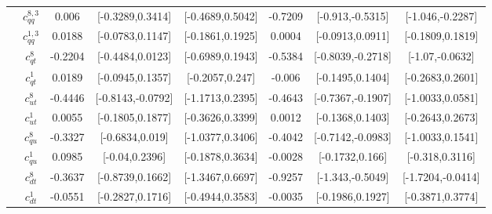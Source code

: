 \documentclass{article}
\begin{document}
\begin{table}[H]
\begin{tabular}{|c|c|c|c|c|c|c|c|}
 & $c_{qq}^{8,3}$ & 0.006                             & [-0.3289,0.3414]                                 & [-0.4689,0.5042] & -0.7209                             & [-0.913,-0.5315]                                 & [-1.046,-0.2287] \\ \cline{2-8}
 & $c_{qq}^{1,3}$ & 0.0188                             & [-0.0783,0.1147]                                 & [-0.1861,0.1925] & 0.0004                             & [-0.0913,0.0911]                                 & [-0.1809,0.1819] \\ \cline{2-8}
 & $c_{qt}^{8}$ & -0.2204                             & [-0.4484,0.0123]                                 & [-0.6989,0.1943] & -0.5384                             & [-0.8039,-0.2718]                                 & [-1.07,-0.0632] \\ \cline{2-8}
 & $c_{qt}^{1}$ & 0.0189                             & [-0.0945,0.1357]                                 & [-0.2057,0.247] & -0.006                             & [-0.1495,0.1404]                                 & [-0.2683,0.2601] \\ \cline{2-8}
 & $c_{ut}^{8}$ & -0.4446                             & [-0.8143,-0.0792]                                 & [-1.1713,0.2395] & -0.4643                             & [-0.7367,-0.1907]                                 & [-1.0033,0.0581] \\ \cline{2-8}
 & $c_{ut}^{1}$ & 0.0055                             & [-0.1805,0.1877]                                 & [-0.3626,0.3399] & 0.0012                             & [-0.1368,0.1403]                                 & [-0.2643,0.2673] \\ \cline{2-8}
 & $c_{qu}^{8}$ & -0.3327                             & [-0.6834,0.019]                                 & [-1.0377,0.3406] & -0.4042                             & [-0.7142,-0.0983]                                 & [-1.0033,0.1541] \\ \cline{2-8}
 & $c_{qu}^{1}$ & 0.0985                             & [-0.04,0.2396]                                 & [-0.1878,0.3634] & -0.0028                             & [-0.1732,0.166]                                 & [-0.318,0.3116] \\ \cline{2-8}
 & $c_{dt}^{8}$ & -0.3637                             & [-0.8739,0.1662]                                 & [-1.3467,0.6697] & -0.9257                             & [-1.343,-0.5049]                                 & [-1.7204,-0.0414] \\ \cline{2-8}
 & $c_{dt}^{1}$ & -0.0551                             & [-0.2827,0.1716]                                 & [-0.4944,0.3583] & -0.0035                             & [-0.1986,0.1927]                                 & [-0.3871,0.3774] \\ \cline{2-8}

\end{tabular}
\end{table}
\end{document}
